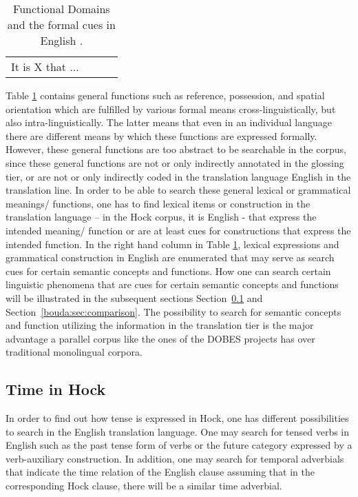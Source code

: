 \begin{table}
\begin{tabular}{p{2cm}p{3cm}p{3cm}p{3cm}}
It is X that ...

\end{tabular}
\normalsize
 \caption{Functional Domains and the formal cues in English \citep[based on][]{LehmannEtAl2004}.}
\label{bouda:tab:functionaldomains}
\end{table}

Table \ref{bouda:tab:functionaldomains} contains general functions such as reference, possession, and spatial orientation which are fulfilled by various formal means cross-linguistically, but also intra-linguistically. The latter means that even in an individual language there are different means by which these functions are expressed formally. However, these general functions are too abstract to be searchable in the corpus, since these general functions are not or only indirectly annotated in the glossing tier, or are not or only indirectly coded in the translation language English in the translation line. In order to be able to search these general lexical or grammatical meanings/ functions, one has to find lexical items or construction in the translation language -- in the Hoc{\A}k corpus, it is English - that express the intended meaning/ function or are at least cues for constructions that express the intended function. In the right hand column in Table \ref{bouda:tab:functionaldomains}, lexical expressions and grammatical construction in English are enumerated that may serve as search cues for certain semantic concepts and functions. How one can search certain linguistic phenomena that are cues for certain semantic concepts and functions will be illustrated in the subsequent sections Section\ \ref{bouda:sec:tense} and Section\ \ref{bouda:sec:comparison}. The possibility to search for semantic concepts and function utilizing the information in the translation tier is the major advantage a parallel corpus like the ones of the DOBES projects has over traditional monolingual corpora. 

\subsection{Time in Hoc{\A}k}\label{bouda:sec:tense}

In order to find out how tense is expressed in Hoc{\A}k, one has different possibilities to search in the English translation language. One may search for tensed verbs in English such as the past tense form of verbs or the future category expressed by a verb-auxiliary construction. In addition, one may search for temporal adverbials that indicate the time relation of the English clause assuming that in the corresponding Hoc{\A}k clause, there will be a similar time adverbial. 

